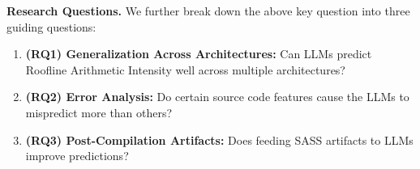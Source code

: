 
\textbf{Research Questions.} 
We further break down the above key question into three guiding questions:
\begin{enumerate}
    \item \textbf{(RQ1) Generalization Across Architectures:} 
    Can LLMs predict Roofline Arithmetic Intensity well across multiple architectures?
    \item \textbf{(RQ2) Error Analysis:} 
    Do certain source code features cause the LLMs to mispredict more than others?
    \item \textbf{(RQ3) Post-Compilation Artifacts:} 
    Does feeding SASS artifacts to LLMs improve predictions?
\end{enumerate}


